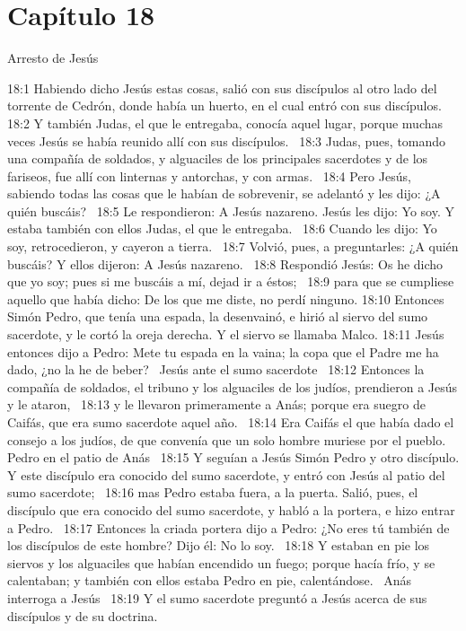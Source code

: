 \section*{Capítulo 18}
Arresto de Jesús   

18:1 Habiendo dicho Jesús estas cosas, salió con sus discípulos al otro lado del torrente de Cedrón, donde había un huerto, en el cual entró con sus discípulos.  
18:2 Y también Judas, el que le entregaba, conocía aquel lugar, porque muchas veces Jesús se había reunido allí con sus discípulos.  
18:3 Judas, pues, tomando una compañía de soldados, y alguaciles de los principales sacerdotes y de los fariseos, fue allí con linternas y antorchas, y con armas.  
18:4 Pero Jesús, sabiendo todas las cosas que le habían de sobrevenir, se adelantó y les dijo: ¿A quién buscáis?  
18:5 Le respondieron: A Jesús nazareno. Jesús les dijo: Yo soy. Y estaba también con ellos Judas, el que le entregaba.  
18:6 Cuando les dijo: Yo soy, retrocedieron, y cayeron a tierra.  
18:7 Volvió, pues, a preguntarles: ¿A quién buscáis? Y ellos dijeron: A Jesús nazareno.  
18:8 Respondió Jesús: Os he dicho que yo soy; pues si me buscáis a mí, dejad ir a éstos;  
18:9 para que se cumpliese aquello que había dicho: De los que me diste, no perdí ninguno. 
18:10 Entonces Simón Pedro, que tenía una espada, la desenvainó, e hirió al siervo del sumo sacerdote, y le cortó la oreja derecha. Y el siervo se llamaba Malco. 
18:11 Jesús entonces dijo a Pedro: Mete tu espada en la vaina; la copa que el Padre me ha dado, ¿no la he de beber?  
Jesús ante el sumo sacerdote   
18:12 Entonces la compañía de soldados, el tribuno y los alguaciles de los judíos, prendieron a Jesús y le ataron,  
18:13 y le llevaron primeramente a Anás; porque era suegro de Caifás, que era sumo sacerdote aquel año.  
18:14 Era Caifás el que había dado el consejo a los judíos, de que convenía que un solo hombre muriese por el pueblo. 
Pedro en el patio de Anás   
18:15 Y seguían a Jesús Simón Pedro y otro discípulo. Y este discípulo era conocido del sumo sacerdote, y entró con Jesús al patio del sumo sacerdote;  
18:16 mas Pedro estaba fuera, a la puerta. Salió, pues, el discípulo que era conocido del sumo sacerdote, y habló a la portera, e hizo entrar a Pedro.  
18:17 Entonces la criada portera dijo a Pedro: ¿No eres tú también de los discípulos de este hombre? Dijo él: No lo soy.  
18:18 Y estaban en pie los siervos y los alguaciles que habían encendido un fuego; porque hacía frío, y se calentaban; y también con ellos estaba Pedro en pie, calentándose.  
Anás interroga a Jesús   
18:19 Y el sumo sacerdote preguntó a Jesús acerca de sus discípulos y de su doctrina.  
